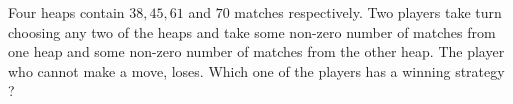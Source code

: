 Four heaps contain $38,45,61$ and $70$ matches respectively. Two players take turn choosing any two of the heaps and take some non-zero number of matches from one heap and some non-zero number of matches from the other heap. The player who cannot make a move, loses. Which one of the players has a winning strategy ?